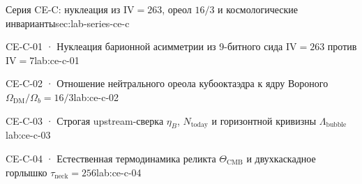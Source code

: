 
\begin{labseries}{Серия CE-C: нуклеация из $\mathrm{IV}=263$, ореол $16/3$ и космологические инварианты}{sec:lab-series-ce-c}

\begin{labrecord}{CE-C-01 · Нуклеация барионной асимметрии из 9-битного сида $\mathrm{IV}=263$ против $\mathrm{IV}=7$}{lab:ce-c-01}

\end{labrecord}

\begin{labrecord}{CE-C-02 · Отношение нейтрального ореола кубооктаэдра к ядру Вороного $\Omega_{\mathrm{DM}}/\Omega_b = 16/3$}{lab:ce-c-02}

\end{labrecord}

\begin{labrecord}{CE-C-03 · Строгая upstream-сверка $\eta_B$, $N_{\mathrm{today}}$ и горизонтной кривизны $\Lambda_{\mathrm{bubble}}$}{lab:ce-c-03}

\end{labrecord}

\begin{labrecord}{CE-C-04 · Естественная термодинамика реликта $\Theta_{\mathrm{CMB}}$ и двухкаскадное горлышко $\tau_{\mathrm{neck}}=256$}{lab:ce-c-04}

\end{labrecord}

\end{labseries}
